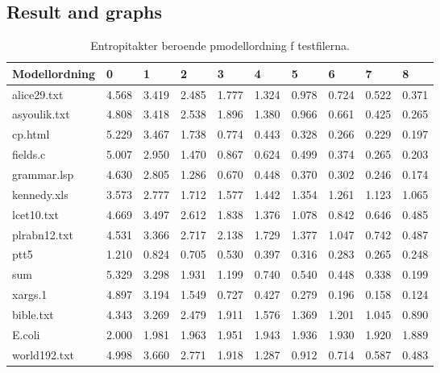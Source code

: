 \documentclass[a4paper,11pt]{article}
\begin{document}
\subsection{Result and graphs}
\begin{table}[h!]
  \label{entropitakt}
  \caption{Entropitakter beroende pmodellordning f testfilerna.}
  \begin{tabular}[h]{|l|l|l|l|l|l|l|l|l|l|}
    \hline
    Modellordning & 0     & 1     & 2     & 3     & 4     & 5     & 6     & 7     & 8\\
    \hline
    alice29.txt   & 4.568 & 3.419 & 2.485 & 1.777 & 1.324 & 0.978 & 0.724 & 0.522 & 0.371 \\ 
    asyoulik.txt  & 4.808 & 3.418 & 2.538 & 1.896 & 1.380 & 0.966 & 0.661 & 0.425 & 0.265 \\ 
    cp.html       & 5.229 & 3.467 & 1.738 & 0.774 & 0.443 & 0.328 & 0.266 & 0.229 & 0.197 \\ 
    fields.c      & 5.007 & 2.950 & 1.470 & 0.867 & 0.624 & 0.499 & 0.374 & 0.265 & 0.203 \\ 
    grammar.lsp   & 4.630 & 2.805 & 1.286 & 0.670 & 0.448 & 0.370 & 0.302 & 0.246 & 0.174 \\ 
    kennedy.xls   & 3.573 & 2.777 & 1.712 & 1.577 & 1.442 & 1.354 & 1.261 & 1.123 & 1.065 \\ 
    lcet10.txt    & 4.669 & 3.497 & 2.612 & 1.838 & 1.376 & 1.078 & 0.842 & 0.646 & 0.485 \\ 
    plrabn12.txt  & 4.531 & 3.366 & 2.717 & 2.138 & 1.729 & 1.377 & 1.047 & 0.742 & 0.487 \\ 
    ptt5          & 1.210 & 0.824 & 0.705 & 0.530 & 0.397 & 0.316 & 0.283 & 0.265 & 0.248 \\ 
    sum           & 5.329 & 3.298 & 1.931 & 1.199 & 0.740 & 0.540 & 0.448 & 0.338 & 0.199 \\ 
    xargs.1       & 4.897 & 3.194 & 1.549 & 0.727 & 0.427 & 0.279 & 0.196 & 0.158 & 0.124 \\ 
    bible.txt     & 4.343 & 3.269 & 2.479 & 1.911 & 1.576 & 1.369 & 1.201 & 1.045 & 0.890 \\ 
    E.coli        & 2.000 & 1.981 & 1.963 & 1.951 & 1.943 & 1.936 & 1.930 & 1.920 & 1.889 \\ 
    world192.txt  & 4.998 & 3.660 & 2.771 & 1.918 & 1.287 & 0.912 & 0.714 & 0.587 & 0.483 \\ 
    \hline
  \end{tabular}
\end{table}
\end{document}

